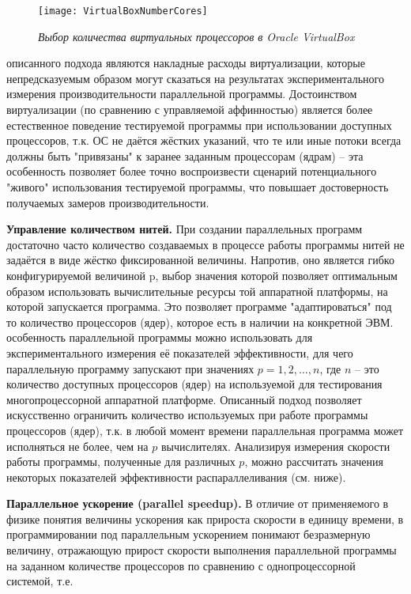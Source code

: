 {	\begin{figure}[H]
		\texttt{[image: VirtualBoxNumberCores]}
		\caption{\textit{Выбор количества виртуальных процессоров в Oracle VirtualBox}}
		\label{VirtualBoxNumberCores:image}
	\end{figure}
	 описанного подхода являются накладные расходы виртуализации, которые непредсказуемым образом могут сказаться на результатах экспериментального измерения производительности параллельной программы. Достоинством виртуализации (по сравнению с управляемой аффинностью) является более естественное поведение тестируемой программы при использовании доступных процессоров, т.к. ОС не даётся жёстких указаний, что те или иные потоки всегда должны быть "привязаны" к заранее заданным процессорам (ядрам) – эта особенность позволяет более точно воспроизвести сценарий потенциального "живого" использования тестируемой программы, что повышает достоверность получаемых замеров производительности. 
	\par\textbf{Управление количеством нитей.} При создании параллельных программ достаточно часто количество создаваемых в процессе работы программы нитей не задаётся в виде жёстко фиксированной величины. Напротив, оно является гибко конфигурируемой величиной p, выбор значения которой позволяет оптимальным образом использовать вычислительные ресурсы той аппаратной платформы, на которой запускается программа. Это позволяет программе "адаптироваться" под то количество процессоров (ядер), которое есть в наличии на конкретной ЭВМ.
	 особенность параллельной программы можно использовать для экспериментального измерения её показателей эффективности, для чего параллельную программу запускают при значениях $p = 1,2,…,n$, где $n$ – это количество доступных процессоров (ядер) на используемой для тестирования многопроцессорной аппаратной платформе. Описанный подход позволяет искусственно ограничить количество используемых при работе программы процессоров (ядер), т.к. в любой момент времени параллельная программа может исполняться не более, чем на $p$ вычислителях. Анализируя измерения скорости работы программы, полученные для различных $p$, можно рассчитать значения некоторых показателей эффективности распараллеливания (см. ниже).
	\par\textbf{Параллельное ускорение (parallel speedup).} В отличие от применяемого в физике понятия величины ускорения как прироста скорости в единицу времени, в программировании под параллельным ускорением понимают безразмерную величину, отражающую прирост скорости выполнения параллельной программы на заданном количестве процессоров по сравнению с однопроцессорной системой, т.е.
}
